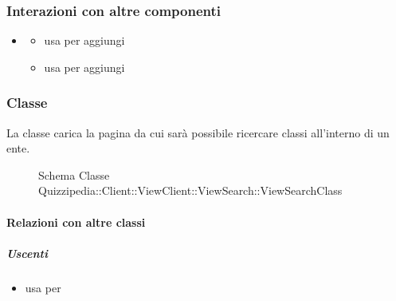 \subsubsection{Interazioni con altre componenti}
\begin{itemize}
\item {}
\begin{itemize}
\item usa  per aggiungi
\item usa  per aggiungi
\end{itemize}
\end{itemize}
\subsubsection{Classe }
La classe carica la pagina da cui sarà possibile ricercare classi all'interno di un ente.
\begin{figure}[H]
\centering
\noindent{}
\caption[Schema Classe ViewSearchClass]{Schema Classe Quizzipedia::Client::ViewClient::ViewSearch::ViewSearchClass}
\end{figure}
\paragraph{Relazioni con altre classi}
\subparagraph{Uscenti}
\begin{itemize}
\item usa  per 
\end{itemize}
